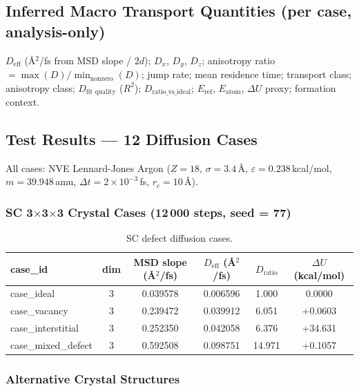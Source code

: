 \documentclass[11pt,a4paper]{article}
\begin{document}
\subsection{Inferred Macro Transport Quantities (per case, analysis-only)}

$D_\text{eff}$ (\AA$^2$/fs from MSD slope / $2d$); $D_x$, $D_y$, $D_z$; anisotropy ratio
$= \max(D) / \min_\text{nonzero}(D)$; jump rate; mean residence time; transport class;
anisotropy class; $D_\text{fit quality}$ ($R^2$); $D_\text{ratio\_vs\_ideal}$;
$E_\text{ref}$, $E_\text{atom}$, $\Delta U$ proxy; formation context.

\subsection{Test Results --- 12 Diffusion Cases}

All cases: NVE Lennard-Jones Argon ($Z=18$, $\sigma=3.4$\,\AA, $\varepsilon=0.238$\,kcal/mol,
$m=39.948$\,amu, $\Delta t = 2\times10^{-3}$\,fs, $r_c=10$\,\AA).

\subsubsection{SC 3$\times$3$\times$3 Crystal Cases (12\,000 steps, seed = 77)}

\begin{table}[h!]
\centering
\small
\begin{tabular}{lccccc}
\toprule
\textbf{case\_id} & \textbf{dim} & \textbf{MSD slope (\AA$^2$/fs)} & \textbf{$D_\text{eff}$ (\AA$^2$/fs)} & \textbf{$D_\text{ratio}$} & \textbf{$\Delta U$ (kcal/mol)} \\
\midrule
case\_ideal        & 3 & 0.039578 & 0.006596 & 1.000  & 0.0000  \\
case\_vacancy      & 3 & 0.239472 & 0.039912 & 6.051  & +0.0603 \\
case\_interstitial & 3 & 0.252350 & 0.042058 & 6.376  & +34.631 \\
case\_mixed\_defect& 3 & 0.592508 & 0.098751 & 14.971 & +0.1057 \\
\bottomrule
\end{tabular}
\caption{SC defect diffusion cases.}
\end{table}

\subsubsection{Alternative Crystal Structures}
\end{document}
